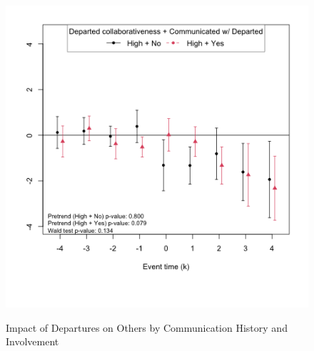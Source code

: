 \begin{figure}
    \caption{Impact of Departures on Others by Communication History and Involvement}
    \label{fig:prs_opened_comm_ext_marg_inv}
    \centering
    \begin{minipage}[b]{0.48\textwidth}
        \centering
         \label{fig:predep_prs_opened_high_collab_comm_ext_marg_inv0}
        \includegraphics[width=\textwidth]{temp/output/collab_imp/inv0_cs_norm_prs_opened_dept_never_comm_predep_High.png}
    \end{minipage}
    \hfill
    \begin{minipage}[b]{0.48\textwidth}
        \centering
         \label{fig:predep_prs_opened_low_collab_comm_ext_marg_inv0}

\end{minipage}
\end{figure}
